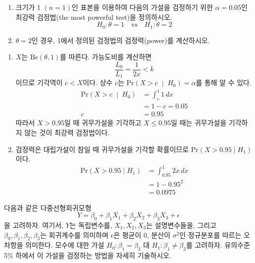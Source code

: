 \documentclass[answers]{exam}
\begin{document}
\begin{questions}
$$   $$
   \begin{enumerate}
    \item 크기가 1 $(n=1)$인 표본을 이용하여 다음의 가설을 검정하기 위한 $\alpha =0.05$인 최강력 검정법(the most powerful test)을 정의하시오.
    $$
      H_{0}:\theta=1\quad \text{vs}\quad H_{1}:\theta=2
    $$
    \item $\theta=2$인 경우, 1에서 정의된 검정법의 검정력(power)를 계산하시오.
   \end{enumerate}
   \begin{solution}
    \begin{enumerate}
      \item $X$는 $\mathrm{Be}\left(\theta,1\right)$를 따른다. 가능도비를 계산하면
      $$
        \dfrac{L_{0}}{L_{1}} = \dfrac{1}{2x} < k
      $$
      이므로 기각역이 $c<X$이다. 상수 $c$는 $\mathrm{Pr}\left(X>c\;\middle|\;H_{0}\right)=\alpha$를 통해 알 수 있다.
      \begin{align}
        \mathrm{Pr}\left(X>c\;\middle|\;H_{0}\right) &= \int_{c}^{1}1\,dx\\
        &= 1-c = 0.05\\
        c &= 0.95
      \end{align}
      따라서 $X>0.95$일 때 귀무가설을 기각하고 $X\leq 0.95$일 때는 귀무가설을 기각하지 않는 것이 최강력 검정법이다.
      \item 검정력은 대립가설이 참일 때 귀무가설을 기각할 확률이므로 $\mathrm{Pr}\left(X>0.95\;|\;H_{1}\right)$이다.
      \begin{align}
        \mathrm{Pr}\left(X>0.95\;|\;H_{1}\right) &= \int_{0.95}^{1}2x\,dx\\
        &= 1-0.95^{2}\\
        &= 0.0975
      \end{align}
    \end{enumerate}
   \end{solution}
   \question
   다음과 같은 다중선형회귀모형
   $$
    Y=\beta_{0}+\beta_{1}X_{1}+\beta_{2}X_{2}+\beta_{3}X_{3}+\epsilon
   $$
   을 고려하자. 여기서, $Y$는 독립변수를, $X_{1},X_{2},X_{3}$는 설명변수들을, 그리고 $\beta_{0},\beta_{1},\beta_{2},\beta_{3}$는 회귀계수를 의미하며 $\epsilon$은 평균이 0, 분산이 $\sigma^{2}$인 정규분포를 따르는 오차항을 의미한다. 모수에 대한 가설 $H_{0}:\beta_{1}=\beta_{3}$ 대 $H_{1}:\beta_{1}\neq \beta_{3}$를 고려하자. 유의수준 5\% 하에서 이 가설을 검정하는 방법을 자세히 기술하시오.
   \begin{solution}

\end{solution}
\end{questions}
\end{document}
